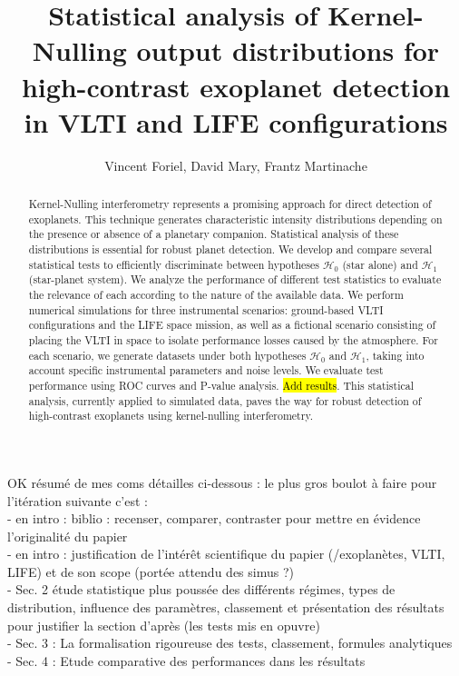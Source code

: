 \documentclass{article}
\title{Statistical analysis of Kernel-Nulling output distributions for high-contrast exoplanet detection in VLTI and LIFE configurations}
\author{Vincent Foriel,
        David Mary,
        Frantz Martinache
       }
\newcommand{\dm}[1]{{\color{mulberry} #1}}
\begin{document}
\maketitle

\begin{abstract}
\begin{abstract}
Kernel-Nulling interferometry represents a promising approach for direct detection of exoplanets. This technique generates characteristic intensity distributions depending on the presence or absence of a planetary companion. Statistical analysis of these distributions is essential for robust planet detection. We develop and compare several statistical tests to efficiently discriminate between hypotheses $\mathcal{H}_0$ (star alone) and $\mathcal{H}_1$ (star-planet system). We analyze the performance of different test statistics to evaluate the relevance of each according to the nature of the available data. We perform numerical simulations for three instrumental scenarios: ground-based VLTI configurations and the LIFE space mission, as well as a fictional scenario consisting of placing the VLTI in space to isolate performance losses caused by the atmosphere. For each scenario, we generate datasets under both hypotheses $\mathcal{H}_0$ and $\mathcal{H}_1$, taking into account specific instrumental parameters and noise levels. We evaluate test performance using ROC curves and P-value analysis. \hl{Add results}. This statistical analysis, currently applied to simulated data, paves the way for robust detection of high-contrast exoplanets using kernel-nulling interferometry.
\end{abstract}
\end{abstract}

\dm{OK résumé de mes coms détailles ci-dessous : le plus gros boulot à faire pour l'itération suivante c'est : \\
- en intro : biblio : recenser, comparer, contraster pour mettre en évidence l'originalité du papier\\
- en intro : justification de l'intérêt scientifique du papier (/exoplanètes, VLTI, LIFE) et de son scope (portée attendu des simus ?) \\
- Sec. 2 étude statistique plus poussée des différents régimes, types de distribution, influence des paramètres, classement et présentation des résultats pour justifier la section d'après (les tests mis en opuvre)\\
- Sec. 3 : La formalisation rigoureuse des tests, classement, formules analytiques \\
- Sec. 4 : Etude comparative des performances dans les résultats }
\end{document}
